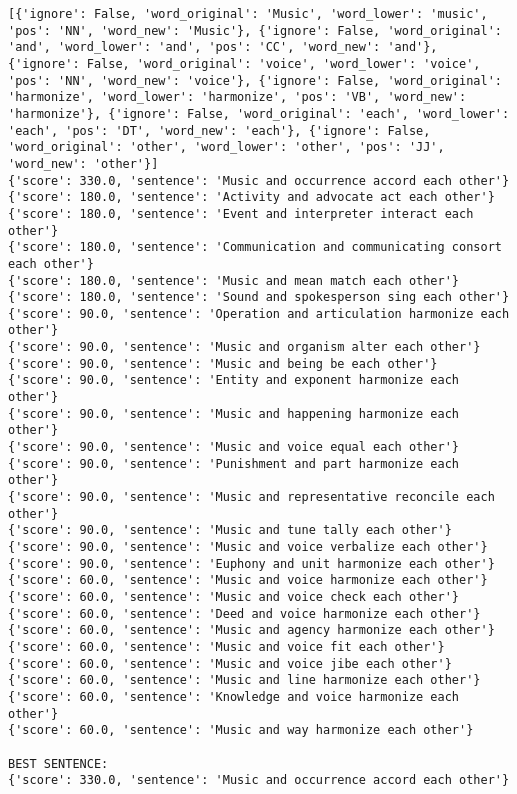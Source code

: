 \documentclass[12pt,a4paper,oneside]{book}
\begin{document}
\begin{verbatim}
[{'ignore': False, 'word_original': 'Music', 'word_lower': 'music', 'pos': 'NN', 'word_new': 'Music'}, {'ignore': False, 'word_original': 'and', 'word_lower': 'and', 'pos': 'CC', 'word_new': 'and'}, {'ignore': False, 'word_original': 'voice', 'word_lower': 'voice', 'pos': 'NN', 'word_new': 'voice'}, {'ignore': False, 'word_original': 'harmonize', 'word_lower': 'harmonize', 'pos': 'VB', 'word_new': 'harmonize'}, {'ignore': False, 'word_original': 'each', 'word_lower': 'each', 'pos': 'DT', 'word_new': 'each'}, {'ignore': False, 'word_original': 'other', 'word_lower': 'other', 'pos': 'JJ', 'word_new': 'other'}]
{'score': 330.0, 'sentence': 'Music and occurrence accord each other'}
{'score': 180.0, 'sentence': 'Activity and advocate act each other'}
{'score': 180.0, 'sentence': 'Event and interpreter interact each other'}
{'score': 180.0, 'sentence': 'Communication and communicating consort each other'}
{'score': 180.0, 'sentence': 'Music and mean match each other'}
{'score': 180.0, 'sentence': 'Sound and spokesperson sing each other'}
{'score': 90.0, 'sentence': 'Operation and articulation harmonize each other'}
{'score': 90.0, 'sentence': 'Music and organism alter each other'}
{'score': 90.0, 'sentence': 'Music and being be each other'}
{'score': 90.0, 'sentence': 'Entity and exponent harmonize each other'}
{'score': 90.0, 'sentence': 'Music and happening harmonize each other'}
{'score': 90.0, 'sentence': 'Music and voice equal each other'}
{'score': 90.0, 'sentence': 'Punishment and part harmonize each other'}
{'score': 90.0, 'sentence': 'Music and representative reconcile each other'}
{'score': 90.0, 'sentence': 'Music and tune tally each other'}
{'score': 90.0, 'sentence': 'Music and voice verbalize each other'}
{'score': 90.0, 'sentence': 'Euphony and unit harmonize each other'}
{'score': 60.0, 'sentence': 'Music and voice harmonize each other'}
{'score': 60.0, 'sentence': 'Music and voice check each other'}
{'score': 60.0, 'sentence': 'Deed and voice harmonize each other'}
{'score': 60.0, 'sentence': 'Music and agency harmonize each other'}
{'score': 60.0, 'sentence': 'Music and voice fit each other'}
{'score': 60.0, 'sentence': 'Music and voice jibe each other'}
{'score': 60.0, 'sentence': 'Music and line harmonize each other'}
{'score': 60.0, 'sentence': 'Knowledge and voice harmonize each other'}
{'score': 60.0, 'sentence': 'Music and way harmonize each other'}

BEST SENTENCE:
{'score': 330.0, 'sentence': 'Music and occurrence accord each other'}



\end{verbatim}
\end{document}
